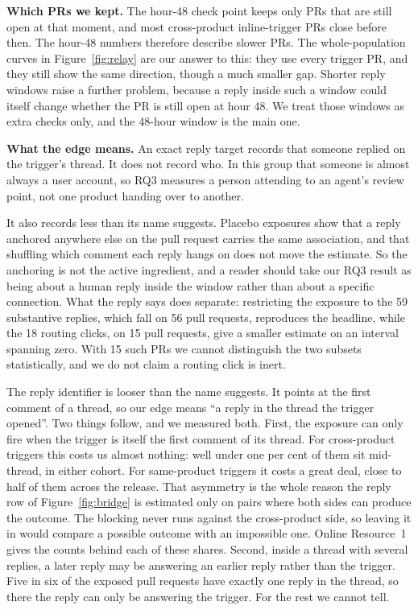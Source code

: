\documentclass[lineno,pdflatex,sn-basic]{sn-jnl}
\begin{document}
\textbf{Which PRs we kept.} The hour-48 check point keeps only PRs that are
still open at that moment, and most cross-product inline-trigger PRs close before
then. The hour-48 numbers therefore describe slower PRs. The whole-population curves in Figure~\ref{fig:relay} are our answer to this:
they use every trigger PR, and they still show the same direction, though a much
smaller gap. Shorter reply windows raise a
further problem, because a reply inside such a window could itself change whether
the PR is still open at hour 48. We treat those windows as extra checks only, and
the 48-hour window is the main one.

\textbf{What the edge means.} An exact reply target records that someone replied
on the trigger's thread. It does not record who. In this group that someone is
almost always a user account, so RQ3 measures a person attending to an agent's
review point, not one product handing over to another.

It also records less than its name suggests. Placebo exposures show that a reply
anchored anywhere else on the pull request carries the same association, and that
shuffling which comment each reply hangs on does not move the estimate. So the
anchoring is not the active ingredient, and a reader should take our RQ3 result as
being about a human reply inside the window rather than about a specific
connection. What the reply says does separate: restricting the exposure to the 59
substantive replies, which fall on 56 pull requests, reproduces the headline,
while the 18 routing clicks, on 15 pull requests, give
a smaller estimate on an interval spanning zero. With 15 such PRs we cannot
distinguish the two subsets statistically, and we do not claim a routing click is
inert.

The reply identifier is looser than the name suggests. It points at the first
comment of a thread, so our edge means ``a reply in the thread the trigger
opened''. Two things follow, and we measured both. First, the exposure can only
fire when the trigger is itself the first comment of its thread. For cross-product triggers this costs us
almost nothing: well under one per cent of them sit mid-thread, in either cohort.
For same-product triggers it costs a great deal, close to half of them across the
release. That asymmetry is the whole reason the reply row of
Figure~\ref{fig:bridge} is estimated only on pairs where both sides can produce
the outcome. The blocking never runs against the cross-product side, so leaving
it in would compare a possible outcome with an impossible one. Online
Resource~1 gives the counts behind each of these shares. Second, inside a thread
with several replies, a later reply may be answering an earlier reply rather than
the trigger. Five in six of the exposed pull requests have exactly one reply in
the thread, so there the reply can only be answering the trigger. For the rest we
cannot tell.
\end{document}

